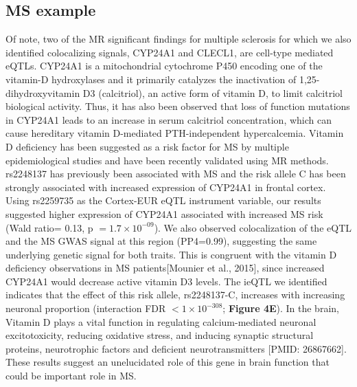 {{\subsection{MS example}
Of note, two of the MR significant findings for multiple sclerosis for which we also identified colocalizing signals, CYP24A1 and CLECL1, are cell-type mediated eQTLs. CYP24A1 is a mitochondrial cytochrome P450 encoding one of the vitamin-D hydroxylases and it primarily catalyzes the inactivation of 1,25-dihydroxyvitamin D3 (calcitriol), an active form of vitamin D, to limit calcitriol biological activity\cite{jones25HydroxyvitaminD24hydroxylaseCYP24A12012}. Thus, it has also been observed that loss of function mutations in CYP24A1 leads to an increase in serum calcitriol concentration, which can cause hereditary vitamin D-mediated PTH-independent hypercalcemia\cite{schlingmannMutationsCYP24A1Idiopathic2011,cappellaniHereditaryHypercalcemiaCaused2019}. Vitamin D deficiency has been suggested as a risk factor for MS by multiple epidemiological studies\cite{agnelloCYP27A1CYP24A1RXRalpha2018,pierrot-deseillignyHypovitaminosisOneEnvironmental2010} and have been recently validated using MR methods\cite{agnelloCYP27A1CYP24A1RXRalpha2018}. rs2248137 has previously been associated with MS\cite{consortium*+MultipleSclerosisGenomic2019} and the risk allele C has been strongly associated with increased expression of CYP24A1 in frontal cortex\cite{ramasamyGeneticEvidencePathogenic2014}. Using rs2259735 as the Cortex-EUR eQTL instrument variable, our results suggested higher expression of CYP24A1 associated with increased MS risk (Wald ratio= 0.13, p $= 1.7 \times 10^{-09}$). We also observed colocalization of the eQTL and the MS GWAS signal at this region (PP4=0.99), suggesting the same underlying genetic signal for both traits. This is congruent with the vitamin D deficiency observations in MS patients[Mounier et al., 2015], since increased CYP24A1 would decrease active vitamin D3 levels. The ieQTL we identified indicates that the effect of this risk allele, rs2248137-C, increases with increasing neuronal proportion (interaction FDR $< 1 \times 10^{-308}$; \textbf{Figure 4E}). In the brain, Vitamin D plays a vital function in regulating calcium-mediated neuronal excitotoxicity, reducing oxidative stress, and inducing synaptic structural proteins, neurotrophic factors and deficient neurotransmitters [PMID: 26867662]. These results suggest an unelucidated role of this gene in brain function that could be important role in MS.  

}}
